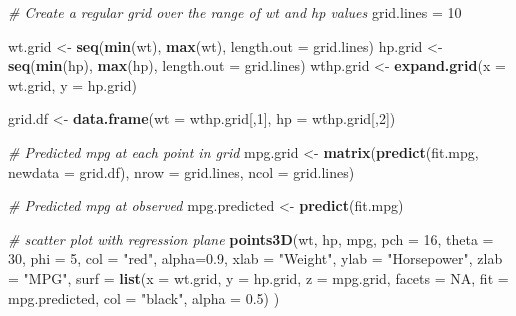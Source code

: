 \documentclass[]{book}
\newenvironment{Shaded}{\begin{snugshade}}{\end{snugshade}}
\newcommand{\CommentTok}[1]{\textcolor[rgb]{0.56,0.35,0.01}{\textit{#1}}}
\newcommand{\DataTypeTok}[1]{\textcolor[rgb]{0.13,0.29,0.53}{#1}}
\newcommand{\DecValTok}[1]{\textcolor[rgb]{0.00,0.00,0.81}{#1}}
\newcommand{\FloatTok}[1]{\textcolor[rgb]{0.00,0.00,0.81}{#1}}
\newcommand{\KeywordTok}[1]{\textcolor[rgb]{0.13,0.29,0.53}{\textbf{#1}}}
\newcommand{\NormalTok}[1]{#1}
\newcommand{\OtherTok}[1]{\textcolor[rgb]{0.56,0.35,0.01}{#1}}
\newcommand{\StringTok}[1]{\textcolor[rgb]{0.31,0.60,0.02}{#1}}
\theoremstyle{definition}
\theoremstyle{definition}
\theoremstyle{definition}
\theoremstyle{remark}
\begin{document}
\begin{Shaded}
\begin{Highlighting}[]
\CommentTok{# Create a regular grid over the range of wt and hp values}
\NormalTok{grid.lines =}\StringTok{ }\DecValTok{10}

\NormalTok{wt.grid <-}\StringTok{ }\KeywordTok{seq}\NormalTok{(}\KeywordTok{min}\NormalTok{(wt), }\KeywordTok{max}\NormalTok{(wt), }\DataTypeTok{length.out =}\NormalTok{ grid.lines)}
\NormalTok{hp.grid <-}\StringTok{ }\KeywordTok{seq}\NormalTok{(}\KeywordTok{min}\NormalTok{(hp), }\KeywordTok{max}\NormalTok{(hp), }\DataTypeTok{length.out =}\NormalTok{ grid.lines)}
\NormalTok{wthp.grid <-}\StringTok{ }\KeywordTok{expand.grid}\NormalTok{(}\DataTypeTok{x =}\NormalTok{ wt.grid, }\DataTypeTok{y =}\NormalTok{ hp.grid)}

\NormalTok{grid.df <-}\StringTok{ }\KeywordTok{data.frame}\NormalTok{(}\DataTypeTok{wt =}\NormalTok{ wthp.grid[,}\DecValTok{1}\NormalTok{], }\DataTypeTok{hp =}\NormalTok{ wthp.grid[,}\DecValTok{2}\NormalTok{])}

\CommentTok{# Predicted mpg at each point in grid}
\NormalTok{mpg.grid <-}\StringTok{ }\KeywordTok{matrix}\NormalTok{(}\KeywordTok{predict}\NormalTok{(fit.mpg, }\DataTypeTok{newdata =}\NormalTok{ grid.df), }
                 \DataTypeTok{nrow =}\NormalTok{ grid.lines, }\DataTypeTok{ncol =}\NormalTok{ grid.lines)}

\CommentTok{# Predicted mpg at observed }
\NormalTok{mpg.predicted <-}\StringTok{ }\KeywordTok{predict}\NormalTok{(fit.mpg)}

\CommentTok{# scatter plot with regression plane}
\KeywordTok{points3D}\NormalTok{(wt, hp, mpg, }
    \DataTypeTok{pch =} \DecValTok{16}\NormalTok{, }\DataTypeTok{theta =} \DecValTok{30}\NormalTok{, }\DataTypeTok{phi =} \DecValTok{5}\NormalTok{, }
    \DataTypeTok{col =} \StringTok{"red"}\NormalTok{, }\DataTypeTok{alpha=}\FloatTok{0.9}\NormalTok{,}
    \DataTypeTok{xlab =} \StringTok{"Weight"}\NormalTok{, }\DataTypeTok{ylab =} \StringTok{"Horsepower"}\NormalTok{, }\DataTypeTok{zlab =} \StringTok{"MPG"}\NormalTok{,  }
    \DataTypeTok{surf =} \KeywordTok{list}\NormalTok{(}\DataTypeTok{x =}\NormalTok{ wt.grid,}
                \DataTypeTok{y =}\NormalTok{ hp.grid, }
                \DataTypeTok{z =}\NormalTok{ mpg.grid, }
                \DataTypeTok{facets =} \OtherTok{NA}\NormalTok{, }
                \DataTypeTok{fit =}\NormalTok{ mpg.predicted,}
                \DataTypeTok{col =} \StringTok{"black"}\NormalTok{, }\DataTypeTok{alpha =} \FloatTok{0.5}\NormalTok{)}
\NormalTok{    )}
\end{Highlighting}
\end{Shaded}
\end{document}
